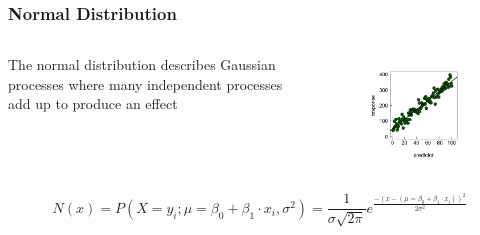 \documentclass{beamer}
\begin{document}
\begin{frame}[fragile]
    \frametitle{Normal Distribution}
    \large
    \begin{columns}
        \begin{column}{0.5\textwidth}
            The normal distribution describes Gaussian processes where many independent processes add up to produce an effect
        \end{column}
        \begin{column}{0.5\textwidth}
            \begin{figure}
            \centering
            \includegraphics[width=\textwidth]{lectures/day_9_refreshing_glm/figures/unnamed-chunk-3-1.png}
            \end{figure}
        \end{column}
    \end{columns}
    \vspace{0.3cm}
    
    \[
    N(x) = P(X = y_i; \mu = \beta_0 + \beta_1 \cdot x_i, \sigma^2) = \frac{1}{\sigma \sqrt{2 \pi}} e^{\frac{-(x - (\mu = \beta_0 + \beta_1 \cdot x_i))^2}{2 \sigma^2}}
    \]
\end{frame}
\end{document}
